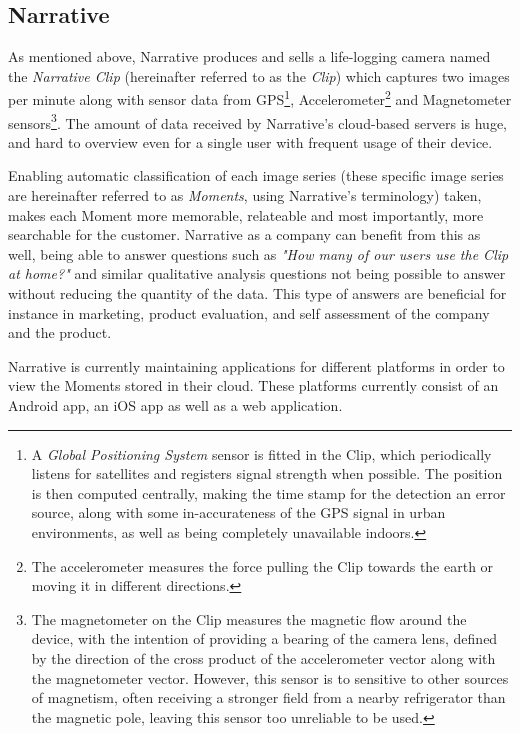 \subsection{Narrative}
As mentioned above, Narrative produces and sells a life-logging camera named
the \emph{Narrative Clip} (hereinafter referred to as the \emph{Clip})
which captures two images per minute along with sensor data from 
GPS\footnote{
    A \emph{Global Positioning System} sensor is fitted in the Clip, which 
    periodically listens for satellites and registers signal strength when
    possible. The position is then computed centrally, making the time stamp
    for the detection an error source, along with some in-accurateness of the 
    GPS signal in urban environments, as well as being completely unavailable
    indoors. 
}, Accelerometer\footnote{
    The accelerometer measures the force pulling the Clip towards the earth or 
    moving it in different directions. 
} and Magnetometer sensors\footnote{
    The magnetometer on the Clip measures the magnetic flow around the device,
    with the intention of providing a bearing of the camera lens, defined by
    the direction of the cross product of the accelerometer vector along with
    the magnetometer vector. However, this sensor is to sensitive to other
    sources of magnetism, often receiving a stronger field from a nearby 
    refrigerator than the magnetic pole, leaving this sensor too unreliable to
    be used.
}. The amount of data received by Narrative's cloud-based servers is huge, 
and hard to overview even for a single user with frequent usage of their device.

Enabling automatic classification of each image series (these specific image 
series are hereinafter referred to as \emph{Moments}, using Narrative's 
terminology) taken, makes each Moment more memorable, relateable and most 
importantly, more searchable for the customer. Narrative as a company 
can benefit from this as well, being able to answer questions such as \emph{
    "How many of our users use the Clip at home?" } 
and similar qualitative analysis questions not being possible to answer 
without reducing the quantity of the data. This type of answers are 
beneficial for instance in marketing, product evaluation, and self 
assessment of the company and the product.

Narrative is currently maintaining applications for different platforms
in order to view the Moments stored in their cloud. These platforms
currently consist of an Android app, an iOS app as well as a web
application. 

